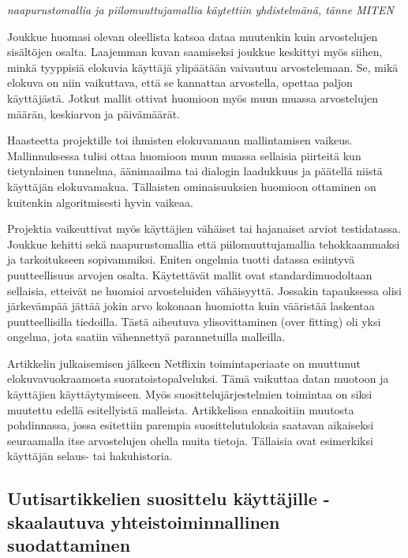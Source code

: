 \documentclass[12pt,finnish]{tktltiki2}
\theoremstyle{definition}
\theoremstyle{remark}
\begin{document}
        \textit{naapurustomallia ja piilomuuttujamallia käytettiin yhdistelmänä, tänne MITEN}
        
        Joukkue huomasi olevan oleellista katsoa dataa muutenkin kuin arvostelujen sisältöjen osalta. Laajemman kuvan saamiseksi joukkue keskittyi myös siihen, minkä tyyppisiä elokuvia käyttäjä ylipäätään vaivautuu arvostelemaan. Se, mikä elokuva on niin vaikuttava, että se kannattaa arvostella, opettaa paljon käyttäjästä. Jotkut mallit ottivat huomioon myös muun muassa arvostelujen määrän, keskiarvon ja päivämäärät.
        
Haasteetta projektille toi ihmisten elokuvamaun mallintamisen vaikeus. Mallinnuksessa tulisi ottaa huomioon muun muassa sellaisia piirteitä kun tietynlainen tunnelma, äänimaailma tai dialogin laadukkuus ja päätellä niistä käyttäjän elokuvamakua. Tällaisten ominaisuuksien huomioon ottaminen on kuitenkin algoritmisesti hyvin vaikeaa.
        
        Projektia vaikeuttivat myös käyttäjien vähäiset tai hajanaiset arviot testidatassa. Joukkue kehitti sekä naapurustomallia että piilomuuttujamallia tehokkaammaksi ja tarkoitukseen sopivammiksi. Eniten ongelmia tuotti datassa esiintyvä puutteellisuus arvojen osalta. Käytettävät mallit ovat standardimuodoltaan sellaisia, etteivät ne huomioi arvosteluiden vähäisyyttä. Jossakin tapauksessa olisi järkevämpää jättää jokin arvo kokonaan huomiotta kuin vääristää laskentaa puutteellisilla tiedoilla. Tästä aiheutuva ylisovittaminen (over fitting) oli yksi ongelma, jota saatiin vähennettyä parannetuilla malleilla.
        
Artikkelin julkaisemisen jälkeen Netflixin toimintaperiaate on muuttunut elokuvavuokraamosta suoratoistopalveluksi. Tämä vaikuttaa datan muotoon ja käyttäjien käyttäytymiseen. Myös suosittelujärjestelmien toimintaa on siksi muutettu edellä esitellyistä malleista. Artikkelissa ennakoitiin muutosta pohdinnassa, jossa esitettiin parempia suosittelutuloksia saatavan aikaiseksi seuraamalla itse arvostelujen ohella muita tietoja. Tällaisia ovat esimerkiksi käyttäjän selaus- tai hakuhistoria.~\cite{Bell:2007:LNP:1345448.1345465}

\subsection{Uutisartikkelien suosittelu käyttäjille - skaalautuva yhteistoiminnallinen suodattaminen}
\end{document}
